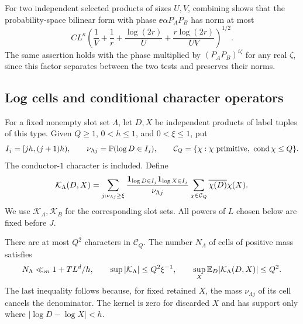 For two independent selected products of sizes $U,V$, combining
 shows that the
probability-space bilinear form with phase $\ee{\alpha P_A P_B}$
has norm at most
\begin{equation}\label{eq:ideal-probability-bilinear}
 C L^\kappa
 \left(\frac1V+\frac1r+\frac{\log(2r)}U+
                   \frac{r\log(2r)}{UV}\right)^{1/2}.
\end{equation}
The same assertion holds with the phase multiplied by
$(P_AP_B)^{i\zeta}$ for any real $\zeta$, since this factor
separates between the two tests and preserves their norms.

\subsection{Log cells and conditional character operators}

For a fixed nonempty slot set $\Lambda$, let $D,X$ be independent
products of label tuples of this type.  Given $Q\geq1$, $0<h\leq1$,
and $0<\xi\leq1$, put
\[
 I_j=[jh,(j+1)h),\qquad
 \nu_{\Lambda j}=\mathbb P(\log D\in I_j),\qquad
 \mathcal C_Q=\{\chi:\chi\text{ primitive},\ \operatorname{cond}\chi\leq Q\}.
\]
The conductor-$1$ character is included.  Define
\begin{equation}\label{eq:ideal-cell-kernel}
 \mathcal K_\Lambda(D,X)
 =\sum_{j:\nu_{\Lambda j}\geq\xi}
   \frac{\mathbf 1_{\log D\in I_j}\mathbf 1_{\log X\in I_j}}{\nu_{\Lambda j}}
        \sum_{\chi\in\mathcal C_Q}\overline{\chi(D)}\chi(X).
\end{equation}
We use $\mathcal K_A,\mathcal K_B$ for the corresponding slot sets.
All powers of $L$ chosen below are fixed before $J$.

There are at most $Q^2$ characters in $\mathcal C_Q$.  The number
$N_\Lambda$ of cells of positive mass satisfies
\begin{equation}\label{eq:ideal-cell-costs}
 N_\Lambda\ll_m1+T L^d/h,\qquad
 \sup|\mathcal K_\Lambda|\leq Q^2\xi^{-1},\qquad
 \sup_X\mathbb E_D|\mathcal K_\Lambda(D,X)|\leq Q^2.
\end{equation}
The last inequality follows because, for fixed retained $X$,
the mass $\nu_{\Lambda j}$ of its cell cancels the denominator.
The kernel is zero for discarded $X$ and has support only where
$|\log D-\log X|<h$.

